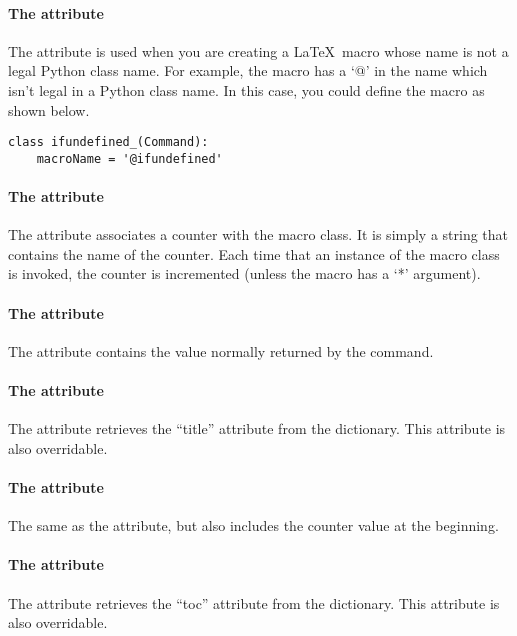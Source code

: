 \paragraph{The  attribute}
The  attribute is used when you are creating a
\LaTeX\ macro whose name is not a legal Python class name.
For example, the macro  has a `@' in the name
which isn't legal in a Python class name.  In this case, you could define
the macro as shown below.
\begin{verbatim}
class ifundefined_(Command):
    macroName = '@ifundefined'
\end{verbatim}

\paragraph{The  attribute}
The  attribute associates a counter with the macro
class.  It is simply a string that contains the name of the counter.
Each time that an instance of the macro class is invoked, the
counter is incremented (unless the macro has a `*' argument).

\paragraph{The  attribute}
The  attribute contains the value normally returned
by the  command.

\paragraph{The  attribute}
The  attribute retrieves the ``title'' attribute from
the  dictionary.  This attribute is also overridable.

\paragraph{The  attribute}
The same as the  attribute, but also includes the
counter value at the beginning.

\paragraph{The  attribute}
The  attribute retrieves the ``toc'' attribute from
the  dictionary.  This attribute is also overridable.

